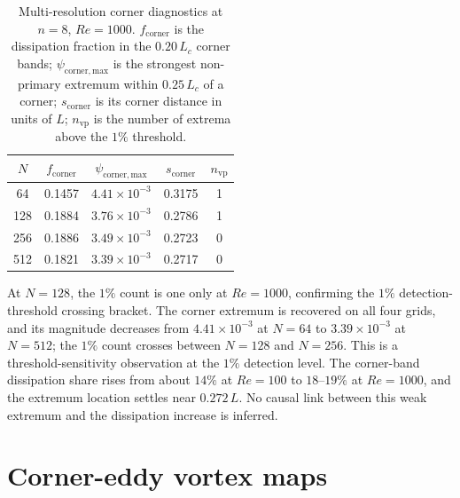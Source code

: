 \documentclass[11pt]{article}
\begin{document}
\begin{table}[H]
\centering
\caption{Multi-resolution corner diagnostics at $n=8$, $Re=1000$.
$f_{\mathrm{corner}}$ is the dissipation fraction in the $0.20\,L_c$ corner
bands; $\psi_{\mathrm{corner,max}}$ is the strongest non-primary extremum within
$0.25\,L_c$ of a corner; $s_{\mathrm{corner}}$ is its corner distance in units
of $L$; $n_{\mathrm{vp}}$ is the number of extrema above the $1\%$ threshold.}




\label{tab:cornerdiag}
\begin{tabular}{ccccc}
\toprule
$N$ & $f_{\mathrm{corner}}$ & $\psi_{\mathrm{corner,max}}$ & $s_{\mathrm{corner}}$ & $n_{\mathrm{vp}}$ \\
\midrule
64 & 0.1457 & $4.41\times10^{-3}$ & 0.3175 & 1 \\
128 & 0.1884 & $3.76\times10^{-3}$ & 0.2786 & 1 \\
256 & 0.1886 & $3.49\times10^{-3}$ & 0.2723 & 0 \\
512 & 0.1821 & $3.39\times10^{-3}$ & 0.2717 & 0 \\
\bottomrule
\end{tabular}
\end{table}
\par


At $N=128$, the $1\%$ count is one only at $Re=1000$, confirming the
$1\%$ detection-threshold crossing bracket. The corner extremum is recovered on
all four grids, and its magnitude decreases from $4.41\times10^{-3}$ at $N=64$
to $3.39\times10^{-3}$ at $N=512$; the $1\%$ count crosses between $N=128$ and
$N=256$. This is a threshold-sensitivity observation at the $1\%$ detection level. The corner-band dissipation share rises from about $14\%$ at
$Re=100$ to $18$--$19\%$ at $Re=1000$, and the extremum location settles near
$0.272\,L$. No causal link between this weak extremum and the dissipation
increase is inferred.

\section{Corner-eddy vortex maps}
\label{sec:corner_maps}
\end{document}
